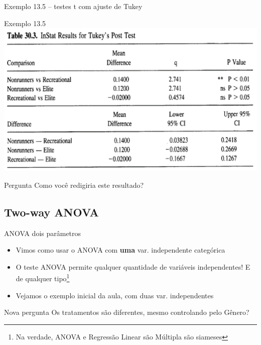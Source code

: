 \documentclass{beamer}
\begin{document}

\begin{frame}{\small Exemplo 13.5 -- testes t com ajuste de Tukey}
  \begin{exampleblock}{Exemplo 13.5}
    \includegraphics[width=\textwidth]{Cap13-30/exemplo13_5-4}
  \end{exampleblock}
  \begin{block}{Pergunta}
    Como você redigiria este resultado?
  \end{block}
\end{frame}

\subsection{Two-way ANOVA}

\begin{frame}{ANOVA dois parâmetros}
  \begin{itemize}
    \footnotesize
  \item Vimos como usar o ANOVA com {\bf uma} var. independente categórica
    \bigskip
  \item O teste ANOVA permite qualquer quantidade de variáveis independentes! E de qualquer tipo\footnote{\scriptsize Na verdade, ANOVA e Regressão Linear são Múltipla são siameses}
    \bigskip
    \bigskip
  \item Vejamos o exemplo inicial da aula, com duas var. independentes
  \end{itemize}
  \begin{block}{Nova pergunta}
    \small
    Os tratamentos são diferentes, mesmo controlando pelo Gênero?
  \end{block}
\end{frame}
\end{document}
